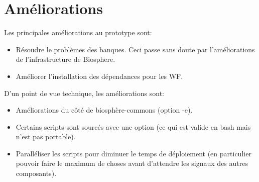 \section{Améliorations}

Les principales améliorations au prototype sont:
\begin{itemize}
	\item Résoudre le problèmes des banques. Ceci passe sans doute par l'améliorations de l'infrastructure de Biosphere.
	\item Améliorer l'installation des dépendances pour les WF.
\end{itemize}
\bigskip

D'un point de vue technique, les améliorations sont:
\begin{itemize}
    \item Améliorations du côté de biosphère-commons (option -e).
    \item Certains scripts sont sourcés avec une option (ce qui est valide en bash mais n'est pas portable).
    \item Paralléliser les scripts pour diminuer le temps de déploiement (en particulier pouvoir faire le maximum de choses avant d'attendre les signaux des autres composants).
\end{itemize}
